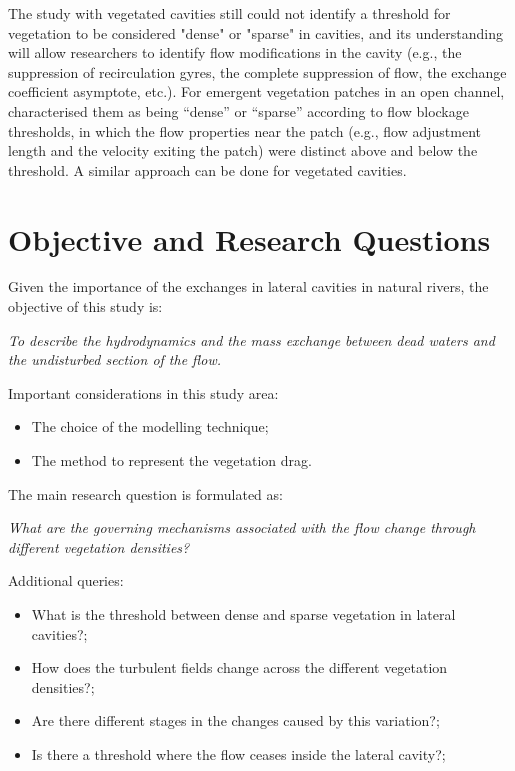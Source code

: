 The study with vegetated cavities still could not identify a threshold for vegetation to be considered "dense" or "sparse" in cavities, and its understanding will allow researchers to identify flow modifications in the cavity (e.g., the suppression of recirculation gyres, the complete suppression of flow, the exchange coefficient asymptote, etc.).  For emergent vegetation patches in an open channel, \textcite{chen2012} characterised them as being “dense” or “sparse” according to flow blockage thresholds, in which the flow properties near the patch (e.g., flow adjustment length and the velocity exiting the patch) were distinct above and below the threshold. A similar approach can be done for vegetated cavities. 
\section{Objective and Research Questions}
Given the importance of the exchanges in lateral cavities in natural rivers, the objective of this study is:

\textit{To describe the hydrodynamics and the mass exchange between dead waters and the undisturbed section of the flow.}

Important considerations in this study area:
\begin{itemize}[noitemsep,topsep=0pt,align=left,itemindent=\parindent]
    \item The choice of the modelling technique;
    \item The method to represent the vegetation drag.
\end{itemize}
The main research question is formulated as:

\textit{What are the governing mechanisms associated with the flow change through different vegetation densities?}

Additional queries:
\begin{itemize}[noitemsep,topsep=0pt,align=left,itemindent=\parindent]
	\item What is the threshold between dense and sparse vegetation in lateral cavities?;
    \item How does the turbulent fields change across the different vegetation densities?;
    \item Are there different stages in the changes caused by this variation?;
    \item Is there a threshold where the flow ceases inside the lateral cavity?;
\end{itemize}

